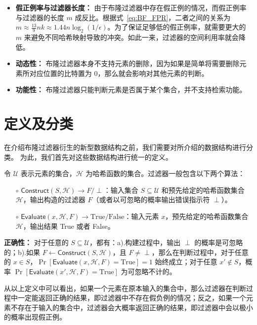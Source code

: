 \begin{itemize}
    \item \textbf{假正例率与过滤器长度：} 由于布隆过滤器中存在假正例的情况，而假正例率与过滤器的长度 $m$ 成反比。根据式~\ref{eq:BF_FPR}，二者之间的关系为 $m\approx \frac{13}{9}nk \approx 1.44n\log_2(1/\epsilon)$。为了保证足够低的假正例率，就需要更大的 $m$ 来避免不同哈希映射导致的冲突。如此一来，过滤器的空间利用率就会降低。
    \item \textbf{动态性：} 布隆过滤器本身不支持元素的删除，因为如果是简单将需要删除元素所对应位置的比特置为 $0$，那么就会影响对其他元素的判断。
    \item \textbf{功能性：} 布隆过滤器只能判断元素是否属于某个集合，并不支持检索功能。
\end{itemize}


\section{定义及分类}\label{sec:defi_cate}

在介绍布隆过滤器衍生的新型数据结构之前，我们需要对所介绍的数据结构进行分类。
为此，我们首先对这些数据结构进行统一的定义。

\begin{definition}[过滤器]\label{def:filter}
    令 $\mathcal{U}$ 表示元素的集合，$\mathcal{H}$ 为哈希函数的集合。过滤器一般包含以下两个算法：
    \begin{itemize}
    \item[$\circ$] $\mathsf{Construct}(S, \mathcal{H}) \to F/\perp$：输入集合 $S \subseteq \mathcal{U}$ 和预先给定的哈希函数集合 $\mathcal{H}$，输出构造的过滤器 $F$（或者以可忽略的概率输出错误指示符 $\perp$）。
    \item[$\circ$] $\mathsf{Evaluate}(x, \mathcal{H}, F) \to \mbox{True}/\mbox{False} $：输入元素 $x$，预先给定的哈希函数集合 $\mathcal{H}$，输出结果 True 或者 False。
    \end{itemize}

    \textbf{正确性：} 对于任意的 $S \subseteq \mathcal{U}$，都有：a).构建过程中，输出 $\perp$ 的概率是可忽略的；b).如果 $F \gets \mathsf{Construct}(S, \mathcal{H})$，且 $F \neq \perp$，那么在判断过程中，对于任意的 $x \in S$，$\Pr[\mathsf{Evaluate}(x, \mathcal{H}, F) = \mbox{True}] = 1$ 始终成立；对于任意 $x' \notin S$，概率 $\Pr[\mathsf{Evaluate}(x', \mathcal{H}, F) = \mbox{True}]$ 为可忽略不计的。
\end{definition}
从以上定义中可以看出，如果一个元素在原本输入的集合中，那么过滤器在判断过程中一定能返回正确的结果，即过滤器中不存在假负例的情况；反之，如果一个元素不存在于输入的集合中，过滤器会大概率返回正确的结果，即过滤器中会以极小的概率出现假正例。

